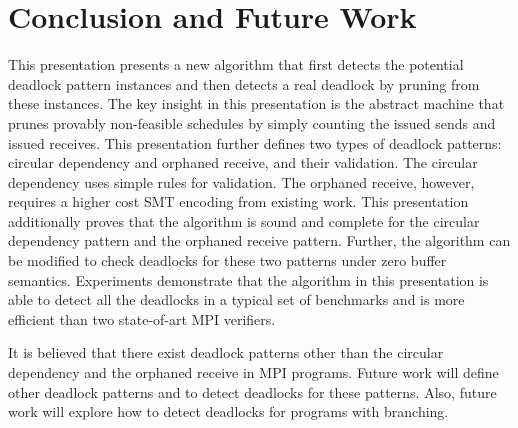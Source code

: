 \section{Conclusion and Future Work}
This presentation presents a new algorithm that first detects the potential deadlock pattern instances and then detects a real deadlock by pruning from these instances.
The key insight in this presentation is the abstract machine that prunes provably non-feasible schedules by simply counting the issued sends and issued receives. 
This presentation further defines two types of deadlock patterns: circular dependency and orphaned receive, and their validation. The circular dependency uses simple rules for validation. The orphaned receive, however, requires a higher cost SMT encoding from existing work. This presentation additionally proves that the algorithm is sound and complete for the circular dependency pattern and the orphaned receive pattern.
Further, the algorithm can be modified to check deadlocks for these two patterns under zero buffer semantics. Experiments demonstrate that the algorithm in this presentation is able to detect all the deadlocks in a typical set of benchmarks and is more efficient than two state-of-art MPI verifiers.

It is believed that there exist deadlock patterns other than the circular dependency and the orphaned receive in MPI programs.
Future work will define other deadlock patterns and to detect deadlocks for these patterns. Also, future work will explore how to detect deadlocks for programs with branching. 

\newpage